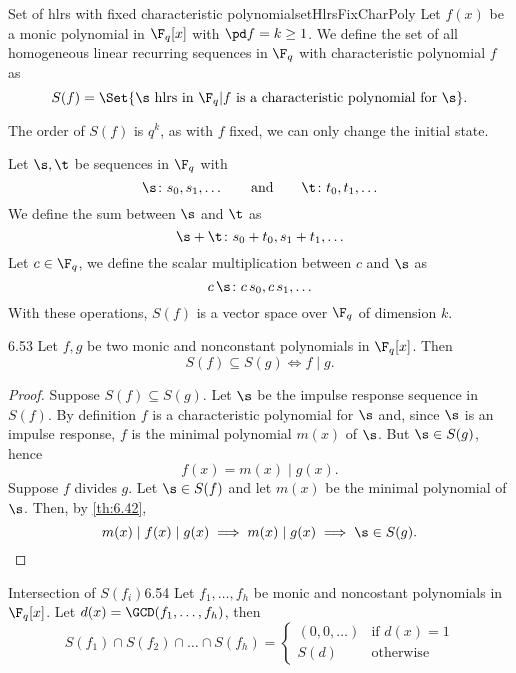 \begin{defn}{Set of hlrs with fixed characteristic polynomial}{setHlrsFixCharPoly}
	Let \(f(x)\) be a monic polynomial in \(\F_q[x]\) with \(\pd f = k \ge 1\). We define the set of all homogeneous linear recurring sequences in \(\F_q\) with characteristic polynomial \(f\) as
	\[
		S(f) = \Set{\s \text{ hlrs in }\F_q | f \text{ is a characteristic polynomial for }\s}.
	\]
\end{defn}

\begin{oss}
	The order of \(S(f)\) is \(q^k\), as with \(f\) fixed, we can only change the initial state.
\end{oss}

\begin{oss}
	Let \(\s,\t\) be sequences in \(\F_q\) with
	\[
		\s\colon s_0,s_1,\ldots \qquad\text{and}\qquad \t\colon t_0,t_1,\ldots
	\]
	We define the sum between \(\s\) and \(\t\) as
	\[
		\s+\t\colon s_0+t_0,s_1+t_1,\ldots
	\]
	Let \(c\in \F_q\), we define the scalar multiplication between \(c\) and \(\s\) as
	\[
		c\,\s\colon c\,s_0,c\,s_1,\ldots
	\]
	With these operations, \(S(f)\) is a vector space over \(\F_q\) of dimension \(k\).
\end{oss}

\begin{teor}{}{6.53}
	Let \(f,g\) be two monic and nonconstant polynomials in \(\F_q[x]\). Then
	\[
		S(f) \subseteq S(g) \iff f \mid g.
	\]
\end{teor}

\begin{proof}
	Suppose \(S(f)\subseteq S(g)\). Let \(\s\) be the impulse response sequence in \(S(f)\). By definition \(f\) is a characteristic polynomial for \(\s\) and, since \(\s\) is an impulse response, \(f\) is the minimal polynomial \(m(x)\) of \(\s\). But \(\s\in S(g)\), hence
	\[
		f(x) = m(x) \mid g(x).
	\]
	Suppose \(f\) divides \(g\). Let \(\s\in S(f)\) and let \(m(x)\) be the minimal polynomial of \(\s\). Then, by \autoref{th:6.42},
	\[
		m(x) \mid f(x) \mid g(x) \implies m(x) \mid g(x) \implies \s \in S(g).
	\]
\end{proof}

\begin{teor}{Intersection of \(S(f_i)\)}{6.54}
	Let \(f_1,\ldots,f_h\) be monic and noncostant polynomials in \(\F_q[x]\). Let \(d(x) = \GCD(f_1,\ldots,f_h)\), then
	\[
		S(f_1) \cap S(f_2) \cap \ldots \cap S(f_h) =
		\begin{cases}
			(0,0,\ldots) & \text{if }d(x)=1 \\
			S(d)         & \text{otherwise}
		\end{cases}
	\]
\end{teor}

